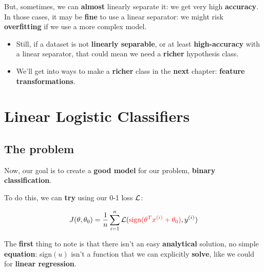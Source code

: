         But, sometimes, we can \textbf{almost} linearly separate it: we get very high \textbf{accuracy}. In those cases, it may be \textbf{fine} to use a linear separator: we might risk \textbf{overfitting} if we use a more complex model.

        \begin{itemize}
            \item Still, if a dataset is not \textbf{linearly separable}, or at least \textbf{high-accuracy} with a linear separator, that could mean we need a \textbf{richer} hypothesis class. 

            \item We'll get into ways to make a \textbf{richer} class in the \textbf{next} chapter: \textbf{feature transformations}.
        \end{itemize}
        
        

\pagebreak

\section{Linear Logistic Classifiers}

    \subsection{The problem}

        Now, our goal is to create a \textbf{good model} for our problem, \textbf{binary classification}.
        
        To do this, we can \textbf{try} using our 0-1 loss $\mathcal{L}$:
        
        \begin{equation}
            J(\theta, \theta_0) = 
            \frac{1}{n} \sum_{i=1}^n 
            \mathcal{L}
            (
                \textcolor{red}{
                    \text{sign}(\theta^Tx^{(i)} + \theta_0)
                    }, 
                y^{(i)}
            )
        \end{equation}
        
        The \textbf{first} thing to note is that there isn't an easy \textbf{analytical} solution, no simple \textbf{equation}: sign$(u)$ isn't a function that we can explicitly \textbf{solve}, like we could for \textbf{linear regression}.
            
